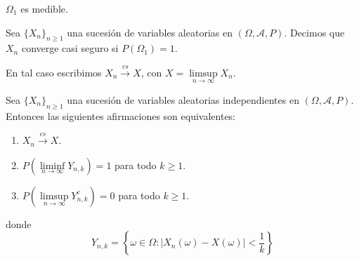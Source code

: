 \begin{corollary}
    $\Omega_1$ es medible.
\end{corollary}

\begin{definition}
    Sea $\{X_n\}_{n \geq 1}$ una sucesión de variables aleatorias en $(\Omega, \mathcal{A}, P)$.
    Decimos que $X_n$ converge casi seguro si $P(\Omega_1) = 1$.

    En tal caso escribimos $X_n \xrightarrow{cs} X$, con $X = \limsup\limits_{n \to \infty} X_n$.
\end{definition}

\begin{theorem}
    Sea $\{X_n\}_{n \geq 1}$ una sucesión de variables aleatorias independientes en $(\Omega, \mathcal{A}, P)$.
    Entonces las siguientes afirmaciones son equivalentes:
    \begin{enumerate}
        \item $X_n \xrightarrow{cs} X$.
        \item $P(\liminf\limits_{n \to \infty} Y_{n, k}) = 1$ para todo $k \geq 1$.
        \item $P(\limsup\limits_{n \to \infty} Y_{n, k}^c) = 0$ para todo $k \geq 1$.
    \end{enumerate}
    donde
    $$Y_{n, k} = \left\{ \omega \in \Omega : |X_n(\omega) - X(\omega)| < \frac{1}{k} \right\}$$
\end{theorem}

